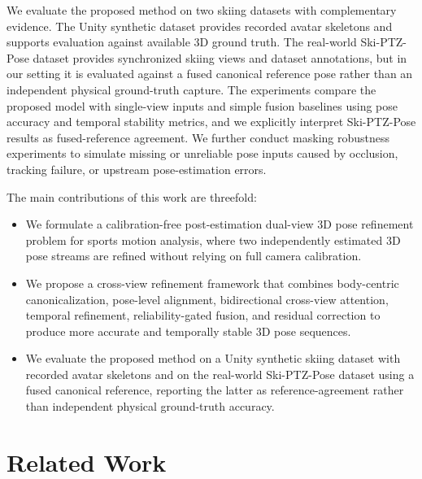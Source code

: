 \documentclass[sigconf,screen]{acmart}
\begin{document}
We evaluate the proposed method on two skiing datasets with complementary evidence. The Unity synthetic dataset provides recorded avatar skeletons and supports evaluation against available 3D ground truth. The real-world Ski-PTZ-Pose dataset provides synchronized skiing views and dataset annotations, but in our setting it is evaluated against a fused canonical reference pose rather than an independent physical ground-truth capture. The experiments compare the proposed model with single-view inputs and simple fusion baselines using pose accuracy and temporal stability metrics, and we explicitly interpret Ski-PTZ-Pose results as fused-reference agreement. We further conduct masking robustness experiments to simulate missing or unreliable pose inputs caused by occlusion, tracking failure, or upstream pose-estimation errors.

The main contributions of this work are threefold:
\begin{itemize}
    \item We formulate a calibration-free post-estimation dual-view 3D pose refinement problem for sports motion analysis, where two independently estimated 3D pose streams are refined without relying on full camera calibration.
    
    \item We propose a cross-view refinement framework that combines body-centric canonicalization, pose-level alignment, bidirectional cross-view attention, temporal refinement, reliability-gated fusion, and residual correction to produce more accurate and temporally stable 3D pose sequences.
    \item We evaluate the proposed method on a Unity synthetic skiing dataset with recorded avatar skeletons and on the real-world Ski-PTZ-Pose dataset using a fused canonical reference, reporting the latter as reference-agreement rather than independent physical ground-truth accuracy.
\end{itemize}

\section{Related Work}
\label{sec:related_work}
\end{document}
